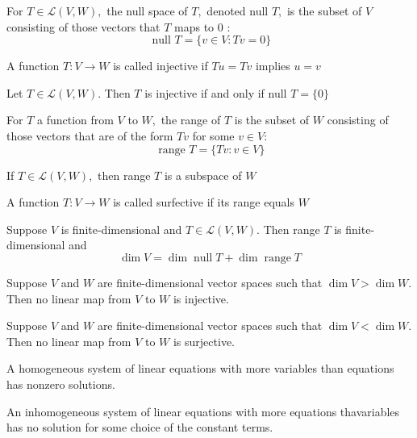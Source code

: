 
For $T \in \mathcal{L}(V, W),$ the null space of $T,$ denoted null $T,$ is the subset of $V$ consisting of those vectors that $T$ maps to 0 :
$$
\text { null } T=\{v \in V: T v=0\}
$$

A function $T: V \rightarrow W$ is called injective if $T u=T v$ implies $u=v$

Let $T \in \mathcal{L}(V, W) .$ Then $T$ is injective if and only if null $T=\{0\}$

For $T$ a function from $V$ to $W,$ the range of $T$ is the subset of $W$ consisting of those vectors that are of the form $T v$ for some $v \in V:$
$$
\text { range } T=\{T v: v \in V\}
$$

If $T \in \mathcal{L}(V, W),$ then range $T$ is a subspace of $W$

A function $T: V \rightarrow W$ is called surfective if its range equals $W$

Suppose $V$ is finite-dimensional and $T \in \mathcal{L}(V, W) .$ Then range $T$ is finite-dimensional and
$$
\operatorname{dim} V=\operatorname{dim} \operatorname{null} T+\operatorname{dim} \operatorname{range} T
$$

Suppose $V$ and $W$ are finite-dimensional vector spaces such that $\operatorname{dim} V>\operatorname{dim} W .$ Then no linear map from $V$ to $W$ is injective.

Suppose $V$ and $W$ are finite-dimensional vector spaces such that $\operatorname{dim} V<\operatorname{dim} W .$ Then no linear map from $V$ to $W$ is surjective.

A homogeneous system of linear equations with more variables than equations has nonzero solutions.

An inhomogeneous system of linear equations with more equations thavariables has no solution for some choice of the constant terms.
